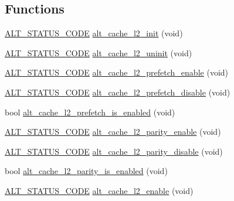 \subsection*{Functions}
\begin{DoxyCompactItemize}
\item 
\mbox{\hyperlink{hwlib_8h_abdb0d369f069723ca55d6c94bcaaaa12}{A\+L\+T\+\_\+\+S\+T\+A\+T\+U\+S\+\_\+\+C\+O\+DE}} \mbox{\hyperlink{group__CACHE__L2_gaa8a03246338e3186f8f465e9f92f96c7}{alt\+\_\+cache\+\_\+l2\+\_\+init}} (void)
\item 
\mbox{\hyperlink{hwlib_8h_abdb0d369f069723ca55d6c94bcaaaa12}{A\+L\+T\+\_\+\+S\+T\+A\+T\+U\+S\+\_\+\+C\+O\+DE}} \mbox{\hyperlink{group__CACHE__L2_ga7c72b6e3e8159ad78631fbbe84de90a1}{alt\+\_\+cache\+\_\+l2\+\_\+uninit}} (void)
\item 
\mbox{\hyperlink{hwlib_8h_abdb0d369f069723ca55d6c94bcaaaa12}{A\+L\+T\+\_\+\+S\+T\+A\+T\+U\+S\+\_\+\+C\+O\+DE}} \mbox{\hyperlink{group__CACHE__L2_ga1dbb9c8fc8a119abd49ee9ed49f774bf}{alt\+\_\+cache\+\_\+l2\+\_\+prefetch\+\_\+enable}} (void)
\item 
\mbox{\hyperlink{hwlib_8h_abdb0d369f069723ca55d6c94bcaaaa12}{A\+L\+T\+\_\+\+S\+T\+A\+T\+U\+S\+\_\+\+C\+O\+DE}} \mbox{\hyperlink{group__CACHE__L2_ga3bc22bfb8ce2160c21b95725863fec16}{alt\+\_\+cache\+\_\+l2\+\_\+prefetch\+\_\+disable}} (void)
\item 
bool \mbox{\hyperlink{group__CACHE__L2_ga427443378a01449d77425d5987f3b0f6}{alt\+\_\+cache\+\_\+l2\+\_\+prefetch\+\_\+is\+\_\+enabled}} (void)
\item 
\mbox{\hyperlink{hwlib_8h_abdb0d369f069723ca55d6c94bcaaaa12}{A\+L\+T\+\_\+\+S\+T\+A\+T\+U\+S\+\_\+\+C\+O\+DE}} \mbox{\hyperlink{group__CACHE__L2_ga0101cd8cb7724cdaf24f6118b43da644}{alt\+\_\+cache\+\_\+l2\+\_\+parity\+\_\+enable}} (void)
\item 
\mbox{\hyperlink{hwlib_8h_abdb0d369f069723ca55d6c94bcaaaa12}{A\+L\+T\+\_\+\+S\+T\+A\+T\+U\+S\+\_\+\+C\+O\+DE}} \mbox{\hyperlink{group__CACHE__L2_ga844dcab3f941e07b72efc46b14bb2109}{alt\+\_\+cache\+\_\+l2\+\_\+parity\+\_\+disable}} (void)
\item 
bool \mbox{\hyperlink{group__CACHE__L2_gaf3286f34867940e182bf7fbb467521e1}{alt\+\_\+cache\+\_\+l2\+\_\+parity\+\_\+is\+\_\+enabled}} (void)
\item 
\mbox{\hyperlink{hwlib_8h_abdb0d369f069723ca55d6c94bcaaaa12}{A\+L\+T\+\_\+\+S\+T\+A\+T\+U\+S\+\_\+\+C\+O\+DE}} \mbox{\hyperlink{group__CACHE__L2_gac2d766315c914d39ea4fabc35342146a}{alt\+\_\+cache\+\_\+l2\+\_\+enable}} (void)
\item 

\end{DoxyCompactItemize}
